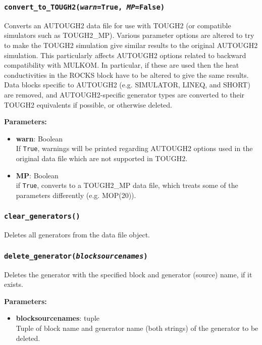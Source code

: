 \subsubsection{\texttt{convert\_to\_TOUGH2(\emph{warn}=True, \emph{MP}=False)}}

Converts an AUTOUGH2 data file for use with TOUGH2 (or compatible simulators such as TOUGH2\_MP).  Various parameter options are altered to try to make the TOUGH2 simulation give similar results to the original AUTOUGH2 simulation.  This particularly affects AUTOUGH2 options related to backward compatibility with MULKOM.  In particular, if these are used then the heat conductivities in the ROCKS block have to be altered to give the same results.  Data blocks specific to AUTOUGH2 (e.g. SIMULATOR, LINEQ, and SHORT) are removed, and AUTOUGH2-specific generator types are converted to their TOUGH2 equivalents if possible, or otherwise deleted.

\textbf{Parameters:}
\begin{itemize}
\item \textbf{warn}: Boolean\\
  If \texttt{True}, warnings will be printed regarding AUTOUGH2 options used in the original data file which are not supported in TOUGH2.
\item \textbf{MP}: Boolean\\
  if \texttt{True}, converts to a TOUGH2\_MP data file, which treats some of the parameters differently (e.g. MOP(20)).
\end{itemize}

\subsubsection{\texttt{clear\_generators()}}

Deletes all generators from the data file object.

\subsubsection{\texttt{delete\_generator(\emph{blocksourcenames})}}

Deletes the generator with the specified block and generator (source) name, if it exists.

\textbf{Parameters:}
\begin{itemize}
\item \textbf{blocksourcenames}: tuple\\
  Tuple of block name and generator name (both strings) of the generator to be deleted.
\end{itemize}

